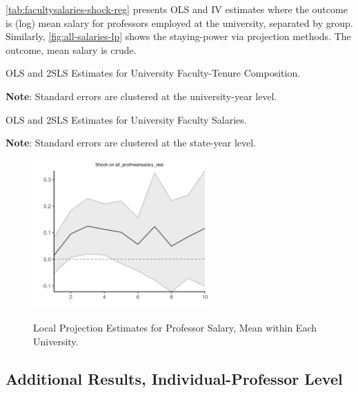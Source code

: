 \documentclass[notitlepage,12pt]{article}
\begin{document}
\autoref{tab:facultysalaries-shock-reg} presents OLS and IV estimates where the outcome is (log) mean salary for professors employed at the university, separated by group.
Similarly, \autoref{fig:all-salaries-lp} shows the staying-power via projection methods.
The outcome, mean salary is crude.

\begin{table}[H]
    \singlespacing
    \centering
    \caption{OLS and 2SLS Estimates for University Faculty-Tenure Composition.}
    \makebox[\textwidth][c]{}
    \begin{flushleft}
        \footnotesize
        \textbf{Note}: Standard errors are clustered at the university-year level.
    \end{flushleft}
    \label{tab:tenurecount-shock-reg-fte}
\end{table}

\begin{table}[H]
    \singlespacing
    \centering
    \caption{OLS and 2SLS Estimates for University Faculty Salaries.}
    \makebox[\textwidth][c]{}
    \begin{flushleft}
        \footnotesize
        \textbf{Note}: Standard errors are clustered at the state-year level.
    \end{flushleft}
    \label{tab:facultysalaries-shock-reg}
\end{table}

\begin{figure}[H]
    \centering
    \singlespacing
    \caption{Local Projection Estimates for Professor Salary, Mean within Each University.}
    \includegraphics[width=0.6\textwidth]{figures/all-salaries-lp.png}
    \label{fig:all-salaries-lp}
\end{figure}


\subsection{Additional Results, Individual-Professor Level}
\end{document}
